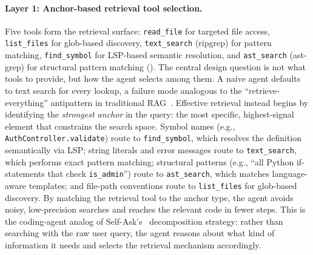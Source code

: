 \paragraph{Layer 1: Anchor-based retrieval tool selection.}
Five tools form the retrieval surface: \texttt{read\_file} for targeted file access, \texttt{list\_files} for glob-based discovery, \texttt{text\_search} (ripgrep) for pattern matching, \texttt{find\_symbol} for LSP-based semantic resolution, and \texttt{ast\_search} (ast-grep) for structural pattern matching (). The central design question is not what tools to provide, but how the agent selects among them. A naive agent defaults to text search for every lookup, a failure mode analogous to the ``retrieve-everything'' antipattern in traditional RAG~\cite{asai2023self}. Effective retrieval instead begins by identifying the \emph{strongest anchor} in the query: the most specific, highest-signal element that constrains the search space. Symbol names (e.g., \texttt{AuthController.validate}) route to \texttt{find\_symbol}, which resolves the definition semantically via LSP; string literals and error messages route to \texttt{text\_search}, which performs exact pattern matching; structural patterns (e.g., ``all Python if-statements that check \texttt{is\_admin}'') route to \texttt{ast\_search}, which matches language-aware templates; and file-path conventions route to \texttt{list\_files} for glob-based discovery. By matching the retrieval tool to the anchor type, the agent avoids noisy, low-precision searches and reaches the relevant code in fewer steps. This is the coding-agent analog of Self-Ask's~\cite{press2022measuring} decomposition strategy: rather than searching with the raw user query, the agent reasons about what kind of information it needs and selects the retrieval mechanism accordingly.

